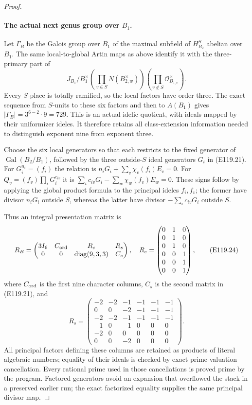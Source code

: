 \begin{proof}
\paragraph{The actual next genus group over $B_1$.}
Let $\Gamma_B$ be the Galois group over $B_1$ of the maximal
subfield of $H^S_{B_2}$ abelian over $B_1$.
The same local-to-global Artin maps as above identify it with
the three-primary part of
\[
 J_{B_1}\Big/
 B_1^\times\left(\prod_{v\in S}N(B_{2,w}^\times)\right)
              \left(\prod_{v\notin S}\mathcal O_{B_{1,v}}^\times\right).
 \tag{E119.23}
\]
Every $S$-place is totally ramified, so the local factors have
order three. The exact sequence from $S$-units to these six
factors and then to $A(B_1)$ gives
$|\Gamma_B|=3^{6-2}\cdot9=729$.
This is an actual idelic quotient, with ideals mapped by their
uniformizer ideles. It therefore retains all class-extension
information needed to distinguish exponent nine from exponent three.

Choose the six local generators so that each restricts to the
fixed generator of $\operatorname{Gal}(B_2/B_1)$, followed by
the three outside-$S$ ideal generators $G_i$ in (E119.21).
For $G_i^{n_i}=(f_i)$ the relation is
$n_iG_i+\sum_v\chi_v(f_i)E_v=0$.
For $Q_v=(f_v)\prod_iG_i^{c_{iv}}$ it is
$\sum_i c_{iv}G_i-\sum_w\chi_w(f_v)E_w=0$.
These signs follow by applying the global product formula to
the principal ideles $f_i,f_v$; the former have divisor
$n_iG_i$ outside $S$, whereas the latter have divisor
$-\sum_i c_{iv}G_i$ outside $S$.

Thus an integral presentation matrix is
\[
 R_B=
 \begin{pmatrix}
 3I_6&C_{\rm ord}&R_c&R_s\\
 0&0&\operatorname{diag}(9,3,3)&C_s
 \end{pmatrix},\quad
 R_c=\begin{pmatrix}0&1&0\\0&1&0\\0&1&0\\0&0&1\\0&0&1\\0&0&1\end{pmatrix},
 \tag{E119.24}
\]
where $C_{\rm ord}$ is the first nine character columns,
$C_s$ is the second matrix in (E119.21), and
\[
 R_s=\begin{pmatrix}
 -2&-2&-1&-1&-1&-1\\
 0&0&-2&-1&-1&-1\\
 -2&-2&-1&-1&-1&-1\\
 -1&0&-1&0&0&0\\
 -2&0&0&0&0&0\\
 0&0&-2&0&0&0
 \end{pmatrix}.
 \tag{E119.25}
\]
All principal factors defining these columns are retained as
products of literal algebraic numbers; equality of their ideals
is checked by exact prime-valuation cancellation. Every rational
prime used in those cancellations is proved prime by the program.
Factored generators avoid an expansion that overflowed the stack
in a preserved earlier run; the exact factorized equality supplies
the same principal divisor map.


\end{proof}
